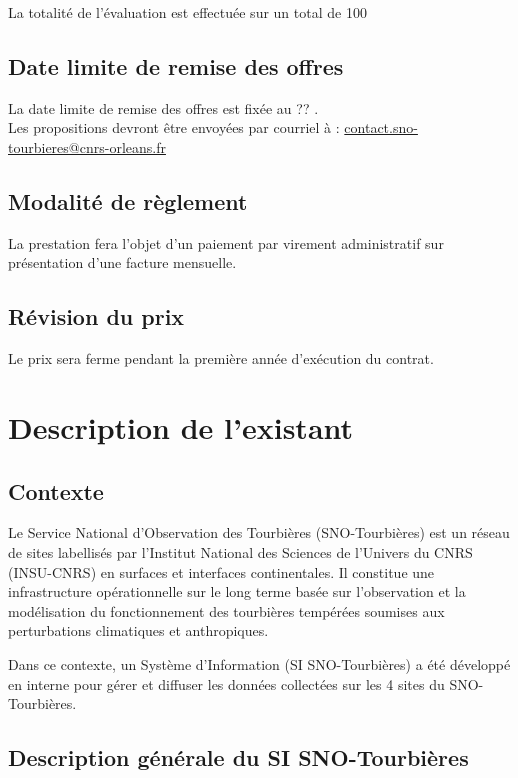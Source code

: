 \documentclass[]{article}
\newcommand{\SNOT}{{SNO-Tourbières}}
\begin{document}
La totalité de l'évaluation est effectuée sur un total de 100

\subsection{Date limite de remise des offres}

La date limite de remise des offres est fixée au ?? .\\
Les propositions devront être envoyées par courriel à : \href{mailto:contact.sno-tourbieres@cnrs-orleans.fr}{contact.sno-tourbieres@cnrs-orleans.fr}

\subsection{Modalité de règlement}

La prestation fera l'objet d’un paiement par virement administratif sur présentation d'une facture mensuelle.

\subsection{Révision du prix}

Le prix sera ferme pendant la première année d’exécution du contrat.

\section{Description de l'existant}

\subsection{Contexte}

Le Service National d'Observation des Tourbières (\SNOT) est un réseau de sites labellisés par l'Institut National des Sciences de l’Univers du CNRS (INSU-CNRS) en surfaces et interfaces continentales. Il constitue une infrastructure opérationnelle sur le long terme basée sur l'observation et la modélisation du fonctionnement des tourbières tempérées soumises aux perturbations climatiques et anthropiques.

Dans ce contexte, un Système d'Information (SI \SNOT) a été développé en interne pour gérer et diffuser les données collectées sur les 4 sites du SNO-Tourbières.

\subsection{Description générale du SI \SNOT}
\end{document}
